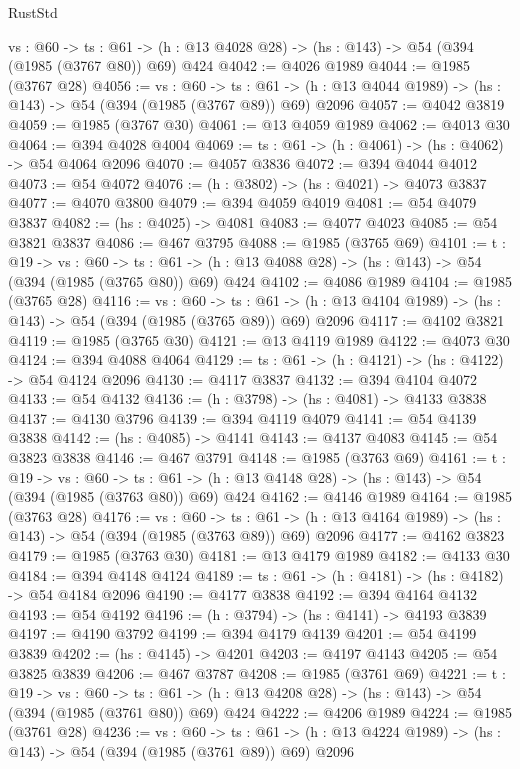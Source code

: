 \begin{lexlean}{RustStd}
\begin{coremodule}
  {vs : @60} ->
  {ts : @61} -> (h : @13 @4028 @28) -> (hs : @143) -> @54 (@394 (@1985 (@3767 @80)) @69) @424
@4042 := @4026 @1989
@4044 := @1985 (@3767 @28)
@4056 := {vs : @60} ->
  {ts : @61} -> (h : @13 @4044 @1989) -> (hs : @143) -> @54 (@394 (@1985 (@3767 @89)) @69) @2096
@4057 := @4042 @3819
@4059 := @1985 (@3767 @30)
@4061 := @13 @4059 @1989
@4062 := @4013 @30
@4064 := @394 @4028 @4004
@4069 := {ts : @61} -> (h : @4061) -> (hs : @4062) -> @54 @4064 @2096
@4070 := @4057 @3836
@4072 := @394 @4044 @4012
@4073 := @54 @4072
@4076 := (h : @3802) -> (hs : @4021) -> @4073 @3837
@4077 := @4070 @3800
@4079 := @394 @4059 @4019
@4081 := @54 @4079 @3837
@4082 := (hs : @4025) -> @4081
@4083 := @4077 @4023
@4085 := @54 @3821 @3837
@4086 := @467 @3795
@4088 := @1985 (@3765 @69)
@4101 := {t : @19} ->
  {vs : @60} ->
  {ts : @61} -> (h : @13 @4088 @28) -> (hs : @143) -> @54 (@394 (@1985 (@3765 @80)) @69) @424
@4102 := @4086 @1989
@4104 := @1985 (@3765 @28)
@4116 := {vs : @60} ->
  {ts : @61} -> (h : @13 @4104 @1989) -> (hs : @143) -> @54 (@394 (@1985 (@3765 @89)) @69) @2096
@4117 := @4102 @3821
@4119 := @1985 (@3765 @30)
@4121 := @13 @4119 @1989
@4122 := @4073 @30
@4124 := @394 @4088 @4064
@4129 := {ts : @61} -> (h : @4121) -> (hs : @4122) -> @54 @4124 @2096
@4130 := @4117 @3837
@4132 := @394 @4104 @4072
@4133 := @54 @4132
@4136 := (h : @3798) -> (hs : @4081) -> @4133 @3838
@4137 := @4130 @3796
@4139 := @394 @4119 @4079
@4141 := @54 @4139 @3838
@4142 := (hs : @4085) -> @4141
@4143 := @4137 @4083
@4145 := @54 @3823 @3838
@4146 := @467 @3791
@4148 := @1985 (@3763 @69)
@4161 := {t : @19} ->
  {vs : @60} ->
  {ts : @61} -> (h : @13 @4148 @28) -> (hs : @143) -> @54 (@394 (@1985 (@3763 @80)) @69) @424
@4162 := @4146 @1989
@4164 := @1985 (@3763 @28)
@4176 := {vs : @60} ->
  {ts : @61} -> (h : @13 @4164 @1989) -> (hs : @143) -> @54 (@394 (@1985 (@3763 @89)) @69) @2096
@4177 := @4162 @3823
@4179 := @1985 (@3763 @30)
@4181 := @13 @4179 @1989
@4182 := @4133 @30
@4184 := @394 @4148 @4124
@4189 := {ts : @61} -> (h : @4181) -> (hs : @4182) -> @54 @4184 @2096
@4190 := @4177 @3838
@4192 := @394 @4164 @4132
@4193 := @54 @4192
@4196 := (h : @3794) -> (hs : @4141) -> @4193 @3839
@4197 := @4190 @3792
@4199 := @394 @4179 @4139
@4201 := @54 @4199 @3839
@4202 := (hs : @4145) -> @4201
@4203 := @4197 @4143
@4205 := @54 @3825 @3839
@4206 := @467 @3787
@4208 := @1985 (@3761 @69)
@4221 := {t : @19} ->
  {vs : @60} ->
  {ts : @61} -> (h : @13 @4208 @28) -> (hs : @143) -> @54 (@394 (@1985 (@3761 @80)) @69) @424
@4222 := @4206 @1989
@4224 := @1985 (@3761 @28)
@4236 := {vs : @60} ->
  {ts : @61} -> (h : @13 @4224 @1989) -> (hs : @143) -> @54 (@394 (@1985 (@3761 @89)) @69) @2096

\end{coremodule}
\end{lexlean}
